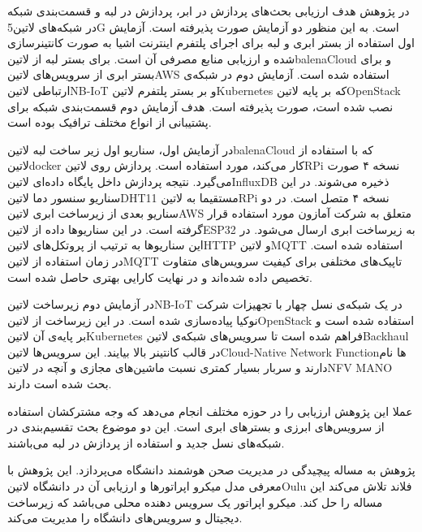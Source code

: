 
در پژوهش  هدف ارزیابی بحث‌های پردازش در ابر، پردازش در لبه و قسمت‌بندی شبکه در شبکه‌های ‌لاتین{5G} است.
به این منظور دو آزمایش صورت پذیرفته است. آزمایش اول استفاده از بستر ابری و لبه برای اجرای پلتفرم اینترنت اشیا
به صورت کانتینرسازی شده و ارزیابی منابع مصرفی آن است. برای بستر لبه از ‌لاتین{balenaCloud} و برای بستر ابری از سرویس‌های ‌لاتین{AWS}
استفاده شده است.
آزمایش دوم در شبکه‌ی ارتباطی ‌لاتین{NB-IoT} و بر بستر
پلتفرم ‌لاتین{Kubernetes} که بر پایه ‌لاتین{OpenStack} نصب شده است، صورت پذیرفته است.
هدف آزمایش دوم قسمت‌بندی شبکه برای پشتیبانی از انواع مختلف ترافیک بوده است.

در آزمایش اول، سناریو اول زیر ساخت لبه ‌لاتین{balenaCloud} که با استفاده از ‌لاتین{docker}
کار می‌کند، مورد استفاده است. پردازش روی ‌لاتین{RPi} نسخه ۴ صورت می‌گیرد. نتیجه پردازش داخل پایگاه داده‌ای
‌لاتین{InfluxDB} ذخیره می‌شوند. در این سناریو سنسور دما ‌لاتین{DHT11} مستقیما
به ‌لاتین{RPi} نسخه ۴ متصل است.
در دو سناریو بعدی از زیرساخت ابری ‌لاتین{AWS} متعلق به شرکت آمازون مورد استفاده قرار گرفته است.
در این سناریوها داده از ‌لاتین{ESP32} به زیرساخت ابری ارسال می‌شود. در این سناریوها به ترتیب
از پروتکل‌های ‌لاتین{HTTP} و ‌لاتین{MQTT} استفاده شده است.
در زمان استفاده از ‌لاتین{MQTT} تاپیک‌های مختلفی برای کیفیت سرویس‌های متفاوت تخصیص داده
شده‌اند و در نهایت کارایی بهتری حاصل شده است.

در آزمایش دوم زیرساخت ‌لاتین{NB-IoT} در یک شبکه‌ی نسل چهار با تجهیزات شرکت نوکیا پیاده‌سازی شده است.
در این زیرساخت از ‌لاتین{OpenStack} استفاده شده است و بر پایه‌ی آن ‌لاتین{Kubernetes} فراهم شده است
تا سرویس‌های شبکه‌ی ‌لاتین{Backhaul} در قالب کانتینر بالا بیایند.
این سرویس‌ها ‌لاتین{Cloud-Native Network Function}ها نام دارند و سربار بسیار کمتری نسبت ماشین‌های مجازی
و آنچه در ‌لاتین{NFV MANO} بحث شده است دارند.

عملا این پژوهش ارزیابی را در حوزه مختلف انجام می‌دهد که وجه مشترکشان استفاده از سرویس‌های ابرزی و بسترهای ابری است.
این دو موضوع بحث تقسیم‌بندی در شبکه‌های نسل جدید و استفاده از پردازش در لبه می‌باشند.


پژوهش  به مساله پیچیدگی در مدیریت صحن هوشمند دانشگاه می‌پردازد. این پژوهش با معرفی مدل میکرو اپراتورها و ارزیابی آن در دانشگاه ‌لاتین{Oulu} فلاند تلاش می‌کند این مساله را حل کند.
میکرو اپراتور یک سرویس دهنده محلی می‌باشد که زیرساخت دیجیتال و سرویس‌های دانشگاه را مدیریت می‌کند.

